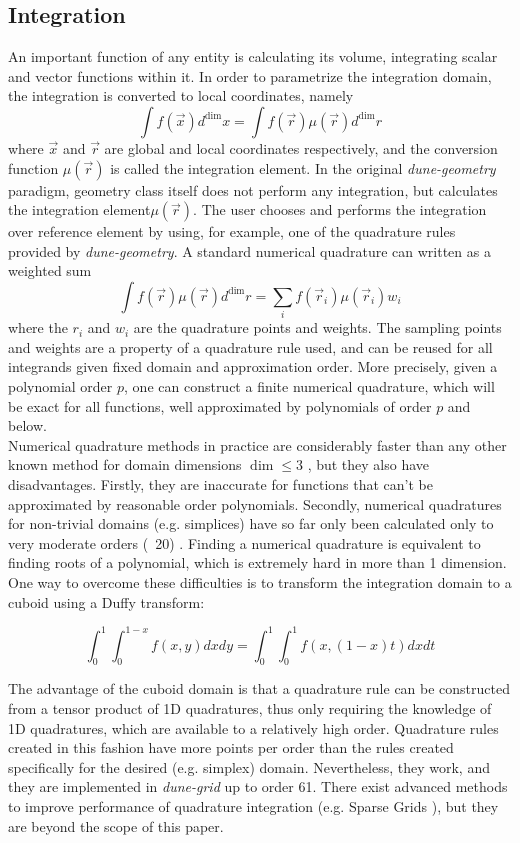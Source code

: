 \subsection{Integration}
\label{sec:theory:integration}

An important function of any entity is calculating its volume, integrating scalar and vector functions within it. In order to parametrize the integration domain, the integration is converted to local coordinates, namely
\[ \int f(\vec{x}) d^{\dim} x = \int f(\vec{r}) \mu(\vec{r}) d^{\dim} r \]
where $\vec{x}$ and $\vec{r}$ are global and local coordinates respectively, and the conversion function $\mu(\vec{r})$ is called the integration element. In the original \textit{dune-geometry} paradigm, geometry class itself does not perform any integration, but calculates the integration element$\mu(\vec{r})$. The user chooses and performs the integration over reference element by using, for example, one of the quadrature rules\cite{abramowitz+1970} provided by \textit{dune-geometry}. A standard numerical quadrature can written as a weighted sum
\[ \int f(\vec{r}) \mu(\vec{r}) d^{\dim} r = \sum_i f(\vec{r}_i) \mu(\vec{r}_i) w_i  \]
where the $r_i$ and $w_i$ are the quadrature points and weights. The sampling points and weights are a property of a quadrature rule used, and can be reused for all integrands given fixed domain and approximation order. More precisely, given a polynomial order $p$, one can construct a finite numerical quadrature, which will be exact for all functions, well approximated by polynomials of order $p$ and below. \\

\noindent
Numerical quadrature methods in practice are considerably faster than any other known method for domain dimensions $\dim \leq 3$ \cite{schurer2003}, but they also have disadvantages. Firstly, they are inaccurate for functions that can't be approximated by reasonable order polynomials. Secondly, numerical quadratures for non-trivial domains (e.g. simplices) have so far only been calculated only to very moderate orders (~20) \cite{zhang+2008}. Finding a numerical quadrature is equivalent to finding roots of a polynomial, which is extremely hard in more than 1 dimension. One way to overcome these difficulties is to transform the integration domain to a cuboid using a Duffy transform:

\[ \int_0^1 \int_0^{1-x} f(x,y) dx dy = \int_0^1 \int_0^1 f(x, (1-x)t ) dx dt  \]

\noindent
The advantage of the cuboid domain is that a quadrature rule can be constructed from a tensor product of 1D quadratures, thus only requiring the knowledge of 1D quadratures, which are available to a relatively high order. Quadrature rules created in this fashion have more points per order than the rules created specifically for the desired (e.g. simplex) domain. Nevertheless, they work, and they are implemented in \textit{dune-grid} up to order 61. There exist advanced methods to improve performance of quadrature integration (e.g. Sparse Grids \cite{petras2000}), but they are beyond the scope of this paper. \\

